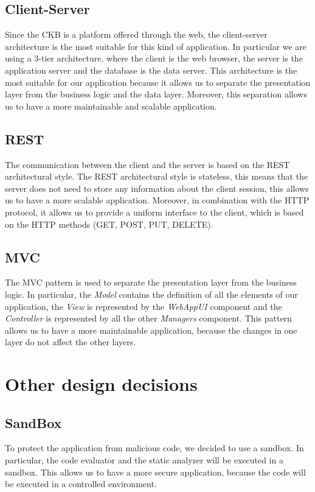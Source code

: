 \subsection{Client-Server}
Since the CKB is a platform offered through the web, the client-server architecture is the most suitable for this kind of application. In particular we are using a 3-tier architecture, where the client is the web browser, the server is the application server and the database is the data server. This architecture is the most suitable for our application because it allows us to separate the presentation layer from the business logic and the data layer. Moreover, this separation allows us to have a more maintainable and scalable application.

\subsection{REST}
The communication between the client and the server is based on the REST architectural style. The REST architectural style is stateless, this means that the server does not need to store any information about the client session, this allows us to have a more scalable application. Moreover, in combination with the HTTP protocol, it allows us to provide a uniform interface to the client, which is based on the HTTP methods (GET, POST, PUT, DELETE).

\subsection{MVC}
The MVC pattern is used to separate the presentation layer from the business logic. In particular, the \textit{Model} contains the definition of all the elements of our application, the \textit{View} is represented by the \textit{WebAppUI} component and the \textit{Controller} is represented by all the other \textit{Managers} component. This pattern allows us to have a more maintainable application, because the changes in one layer do not affect the other layers.


\section{Other design decisions}
\label{s:other-design-decisions}%

\subsection{SandBox}
\label{ss:other-design-decisions-sandbox}%
To protect the application from malicious code, we decided to use a sandbox. In particular, the code evaluator and the static analyzer will be executed in a sandbox. This allows us to have a more secure application, because the code will be executed in a controlled environment.


